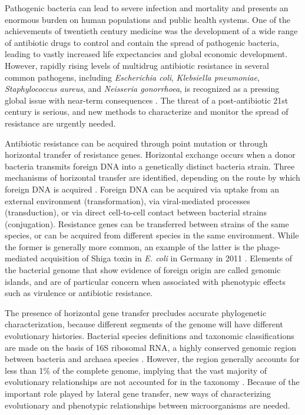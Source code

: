 Pathogenic bacteria can lead to severe infection and mortality and presents an enormous burden on human populations and public health systems.
One of the achievements of twentieth century medicine was the development of a wide range of antibiotic drugs to control and contain the spread of pathogenic bacteria, leading to vastly increased life expectancies and global economic development.
However, rapidly rising levels of multidrug antibiotic resistance in several common pathogens, including \emph{Escherichia coli}, \emph{Klebsiella pneumoniae}, \emph{Staphylococcus aureus}, and \emph{Neisseria gonorrhoea}, is recognized as a pressing global issue with near-term consequences \cite{Neu:1992gk,Thomas:2005hp,WHO:2014wa}.
The threat of a post-antibiotic 21st century is serious, and new methods to characterize and monitor the spread of resistance are urgently needed.

Antibiotic resistance can be acquired through point mutation or through horizontal transfer of resistance genes.
Horizontal exchange occurs when a donor bacteria transmits foreign DNA into a genetically distinct bacteria strain.
Three mechanisms of horizontal transfer are identified, depending on the route by which foreign DNA is acquired \cite{Ochman:2000dr}.
Foreign DNA can be acquired via uptake from an external environment (transformation), via viral-mediated processes (transduction), or via direct cell-to-cell contact between bacterial strains (conjugation).
Resistance genes can be transferred between strains of the same species, or can be acquired from different species in the same environment.
While the former is generally more common, an example of the latter is the phage-mediated acquisition of Shiga toxin in \emph{E. coli} in Germany in 2011 \cite{Rohde:2011ju}.
Elements of the bacterial genome that show evidence of foreign origin are called genomic islands, and are of particular concern when associated with phenotypic effects such as virulence or antibiotic resistance.

The presence of horizontal gene transfer precludes accurate phylogenetic characterization, because different segments of the genome will have different evolutionary histories.
Bacterial species definitions and taxonomic classifications are made on the basis of 16S ribosomal RNA, a highly conserved genomic region between bacteria and archaea species \cite{Woese:1977vd}.
However, the region generally accounts for less than 1\% of the complete genome, implying that the vast majority of evolutionary relationships are not accounted for in the taxonomy \cite{Dagan:2006up}.
Because of the important role played by lateral gene transfer, new ways of characterizing evolutionary and phenotypic relationships between microorganisms are needed.